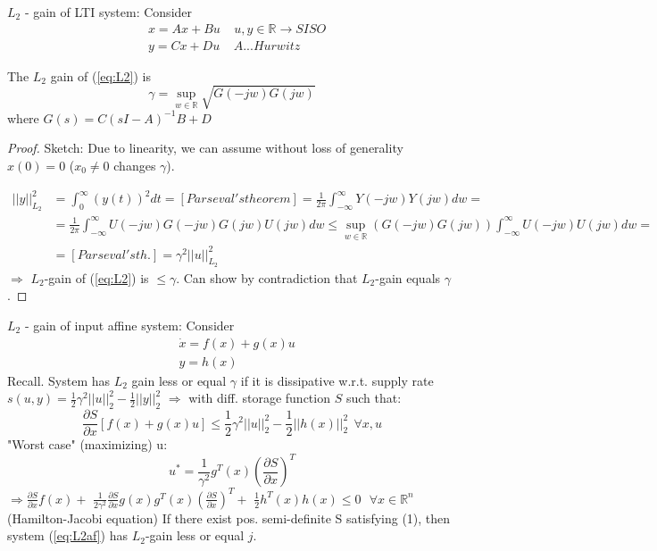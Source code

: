 $L_2$ - gain of LTI system:
 Consider 
 \begin{equation} \label{eq:L2}
\begin{split}
&x=Ax+Bu \ \ \ \ \ u,y\in\mathbb{R}\rightarrow SISO\\
&y=Cx+Du \ \ \ \ \ A ... Hurwitz
\end{split}
\end{equation}
 \begin{Lemma}
The $L_2$ gain of (\ref{eq:L2}) is
$$\gamma=\sup_{w\in\mathbb{R}}\sqrt{G(-jw)G(jw)}$$
 where $G(s)=C(sI-A)^{-1}B+D$
\begin{proof}
 Sketch:
  Due to linearity, we can assume without loss of generality $x(0)=0$ ($x_0 \ne 0$ changes $\gamma$).
  
 \begin{equation*}
  \begin{split}
   ||y||^2_{L_2} &=\int_0^\infty (y(t))^2dt = [Parseval's theorem]=\frac{1}{2\pi}\int_{-\infty}^\infty Y(-jw)Y(jw)dw=\\
                 &=\frac{1}{2\pi}\int_{-\infty}^\infty U(-jw)G(-jw)G(jw)U(jw)dw\le\sup_{w\in\mathbb{R}} (G(-jw)G(jw))\int_{-\infty}^\infty U(-jw)U(jw)dw=\\
                 &=[Parseval's th.] = \gamma^2 ||u||_{L_2}^2
  \end{split}
 \end{equation*}
  $\Rightarrow$ $L_2$-gain of (\ref{eq:L2}) is $\le\gamma$.
  Can show by contradiction that $L_2$-gain equals $\gamma$.
\end{proof}
\end{Lemma}
 $L_2$ - gain of input affine system:
 Consider
 \begin{equation} \label{eq:L2af}
\begin{split}
&\dot x = f(x) +g(x)u\\
&y = h(x)
\end{split}
\end{equation}
 Recall. System has $L_2$ gain less or equal $\gamma$ if it is dissipative w.r.t. supply
rate $s(u,y)=\frac{1}{2}\gamma^2||u||^2_2-\frac{1}{2}||y||_2^2$
 $\Rightarrow$ with diff. storage function $S$ such that:
 $$\frac{\partial S}{\partial x} [f(x)+g(x)u] \le \frac{1}{2}\gamma^2||u||^2_2-\frac{1}{2}||h(x)||_2^2\ \ \forall x,u$$
 "Worst case" (maximizing) u:
 $$u^*=\frac{1}{\gamma^2} g^T(x)\left(\frac{\partial S}{\partial x}\right)^T$$
 $\Rightarrow \frac{\partial S}{\partial x} f(x)+$
$\frac{1}{2\gamma^2}\frac{\partial S}{\partial x}g(x)g^T(x)\left(\frac{\partial S}{\partial x}\right)^T+$
$\frac{1}{2}h^T(x)h(x)\le 0 \ \ \ \forall x\in\mathbb{R}^n$ (Hamilton-Jacobi equation)
 If there exist pos. semi-definite S satisfying (1), then system (\ref{eq:L2af}) has $L_2$-gain
less or equal $j$.

